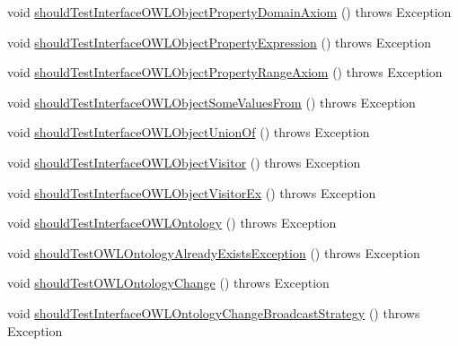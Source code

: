 \begin{DoxyCompactItemize}
void \hyperlink{classorg_1_1semanticweb_1_1owlapi_1_1contract_1_1_contract_owlapi_model__3_test_a33995a8306f2299dd3451e1b2812cc24}{should\-Test\-Interface\-O\-W\-L\-Object\-Property\-Domain\-Axiom} ()  throws Exception 
\item 
void \hyperlink{classorg_1_1semanticweb_1_1owlapi_1_1contract_1_1_contract_owlapi_model__3_test_a923995469f11126954f802ea22d23d6c}{should\-Test\-Interface\-O\-W\-L\-Object\-Property\-Expression} ()  throws Exception 
\item 
void \hyperlink{classorg_1_1semanticweb_1_1owlapi_1_1contract_1_1_contract_owlapi_model__3_test_a249abaff33ab10f77cc077138ab3d4b2}{should\-Test\-Interface\-O\-W\-L\-Object\-Property\-Range\-Axiom} ()  throws Exception 
\item 
void \hyperlink{classorg_1_1semanticweb_1_1owlapi_1_1contract_1_1_contract_owlapi_model__3_test_a991b0f4bd5a79a121d716204be3b0ec0}{should\-Test\-Interface\-O\-W\-L\-Object\-Some\-Values\-From} ()  throws Exception 
\item 
void \hyperlink{classorg_1_1semanticweb_1_1owlapi_1_1contract_1_1_contract_owlapi_model__3_test_aa927d0cb857278dfc9ee2bace7d1ae2c}{should\-Test\-Interface\-O\-W\-L\-Object\-Union\-Of} ()  throws Exception 
\item 
void \hyperlink{classorg_1_1semanticweb_1_1owlapi_1_1contract_1_1_contract_owlapi_model__3_test_acc6e85516df71483a6422fcde802ac3e}{should\-Test\-Interface\-O\-W\-L\-Object\-Visitor} ()  throws Exception 
\item 
void \hyperlink{classorg_1_1semanticweb_1_1owlapi_1_1contract_1_1_contract_owlapi_model__3_test_a5247735d796a7b43a4b17f06dd27c8a6}{should\-Test\-Interface\-O\-W\-L\-Object\-Visitor\-Ex} ()  throws Exception 
\item 
void \hyperlink{classorg_1_1semanticweb_1_1owlapi_1_1contract_1_1_contract_owlapi_model__3_test_afb137e79e261d4327248143a720d0fe6}{should\-Test\-Interface\-O\-W\-L\-Ontology} ()  throws Exception 
\item 
void \hyperlink{classorg_1_1semanticweb_1_1owlapi_1_1contract_1_1_contract_owlapi_model__3_test_a83aa29bf1501e28e11e45ec6a6c7670b}{should\-Test\-O\-W\-L\-Ontology\-Already\-Exists\-Exception} ()  throws Exception 
\item 
void \hyperlink{classorg_1_1semanticweb_1_1owlapi_1_1contract_1_1_contract_owlapi_model__3_test_a1f7d8a781484bc43c7b2e48a7fe65412}{should\-Test\-O\-W\-L\-Ontology\-Change} ()  throws Exception 
\item 
void \hyperlink{classorg_1_1semanticweb_1_1owlapi_1_1contract_1_1_contract_owlapi_model__3_test_a76be7b816fe1f7f1f441ab3f52bd7d7e}{should\-Test\-Interface\-O\-W\-L\-Ontology\-Change\-Broadcast\-Strategy} ()  throws Exception 

\end{DoxyCompactItemize}
